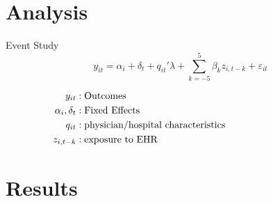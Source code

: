 \documentclass[10pt]{beamer}
\begin{document}
\section{Analysis}

\begin{frame}{Event Study}
\begin{equation*}
    y_{it}=\alpha_i+\delta_t+q_{it}'\lambda+\sum_{k=-5}^5 \beta_kz_{i,t-k} + \varepsilon_{it}
\end{equation*}

\vspace{4mm}

\begin{align*}
    y_{it} &: \text{Outcomes} \hspace{30mm}\\
    \alpha_i, \delta_t &: \text{Fixed Effects}\hspace{30mm}\\
    q_{it} &: \text{physician/hospital characteristics}\hspace{30mm}\\
    z_{i,t-k} &: \text{exposure to EHR} \hspace{30mm}
\end{align*}

    
\end{frame}

\section{Results}
\end{document}
